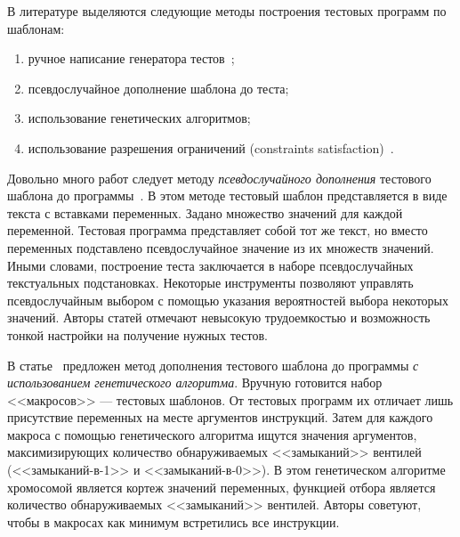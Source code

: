 \documentclass[14pt]{extreport}
\begin{document}
В литературе выделяются следующие методы построения тестовых программ по шаблонам:
\begin{enumerate}
	\item ручное написание генератора тестов~\cite{MicroTESK};
	\item псевдослучайное дополнение шаблона до теста;
	\item использование генетических алгоритмов;
	\item использование разрешения ограничений (constraints satisfaction)~\cite{CLP}.
\end{enumerate}

Довольно много работ следует методу \emph{псевдослучайного дополнения} тестового шаблона до программы~\cite{SEGUE1, SEGUE2, PA-RISC, TSE, Theo, mVpGen}. В этом методе тестовый шаблон представляется в виде текста с вставками переменных. Задано множество значений для каждой переменной. Тестовая программа представляет собой тот же текст, но вместо переменных подставлено псевдослучайное значение из их множеств значений. Иными словами, построение теста заключается в наборе псевдослучайных текстуальных подстановках. Некоторые инструменты позволяют управлять псевдослучайным выбором с помощью указания вероятностей выбора некоторых значений. Авторы статей отмечают невысокую трудоемкостью и возможность тонкой настройки на получение нужных тестов.

В статье~\cite{GeneticTemplates} предложен метод дополнения тестового шаблона до программы \emph{с использованием генетического алгоритма}. Вручную готовится набор <<макросов>> --- тестовых шаблонов. От тестовых программ их отличает лишь присутствие переменных на месте аргументов инструкций. Затем для каждого макроса с помощью генетического алгоритма ищутся значения аргументов, максимизирующих количество обнаруживаемых <<замыканий>> вентилей (<<замыканий-в-1>> и <<замыканий-в-0>>). В этом генетическом алгоритме хромосомой является кортеж значений переменных, функцией отбора является количество обнаруживаемых <<замыканий>> вентилей. Авторы советуют, чтобы в макросах как минимум встретились все инструкции.

\end{document}
